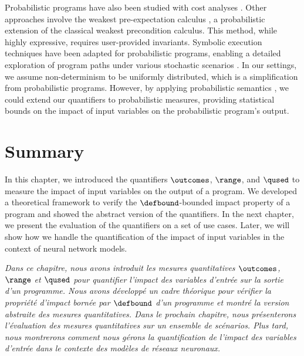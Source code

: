Probabilistic programs have also been studied with cost analyses .
Other approaches involve the weakest pre-expectation calculus , a probabilistic extension of the classical weakest precondition calculus. This method, while highly expressive, requires user-provided invariants.
Symbolic execution techniques have been adapted for probabilistic programs, enabling a detailed exploration of program paths under various stochastic scenarios .
In our settings, we assume non-determinism to be uniformly distributed, which is a simplification from probabilistic programs. However, by applying probabilistic semantics , we could extend our quantifiers to probabilistic measures, providing statistical bounds on the impact of input variables on the probabilistic program's output.


\section{Summary}

In this chapter, we introduced the quantifiers $\outcomes$, $\range$, and $\qused$ to measure the impact of input variables on the output of a program.
We developed a theoretical framework to verify the $\defbound$-bounded impact property of a program and showed the abstract version of the quantifiers.
In the next chapter, we present the evaluation of the quantifiers on a set of use cases.
Later, we will show how we handle the quantification of the impact of input variables in the context of neural network models.


\frenchdiv

\emph{Dans ce chapitre, nous avons introduit les mesures quantitatives $\outcomes$, $\range$ et $\qused$ pour quantifier l'impact des variables d'entrée sur la sortie d'un programme. Nous avons développé un cadre théorique pour vérifier la propriété d'impact bornée par $\defbound$ d'un programme et montré la version abstraite des mesures quantitatives. Dans le prochain chapitre, nous présenterons l'évaluation des mesures quantitatives sur un ensemble de scénarios. Plus tard, nous montrerons comment nous gérons la quantification de l'impact des variables d'entrée dans le contexte des modèles de réseaux neuronaux.}
